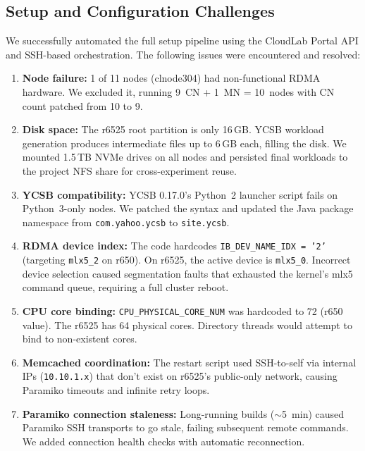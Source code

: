 \documentclass[11pt,a4paper]{article}
\begin{document}
\subsection{Setup and Configuration Challenges}

We successfully automated the full setup pipeline using the CloudLab Portal API and SSH-based orchestration. The following issues were encountered and resolved:

\begin{enumerate}[nosep]
    \item \textbf{Node failure:} 1 of 11 nodes (clnode304) had non-functional RDMA hardware. We excluded it, running 9~CN + 1~MN = 10~nodes with CN count patched from 10 to 9.

    \item \textbf{Disk space:} The r6525 root partition is only 16\,GB. YCSB workload generation produces intermediate files up to 6\,GB each, filling the disk. We mounted 1.5\,TB NVMe drives on all nodes and persisted final workloads to the project NFS share for cross-experiment reuse.

    \item \textbf{YCSB compatibility:} YCSB 0.17.0's Python~2 launcher script fails on Python~3-only nodes. We patched the syntax and updated the Java package namespace from \texttt{com.yahoo.ycsb} to \texttt{site.ycsb}.

    \item \textbf{RDMA device index:} The code hardcodes \texttt{IB\_DEV\_NAME\_IDX~=~'2'} (targeting \texttt{mlx5\_2} on r650). On r6525, the active device is \texttt{mlx5\_0}. Incorrect device selection caused segmentation faults that exhausted the kernel's mlx5 command queue, requiring a full cluster reboot.

    \item \textbf{CPU core binding:} \texttt{CPU\_PHYSICAL\_CORE\_NUM} was hardcoded to 72 (r650 value). The r6525 has 64 physical cores. Directory threads would attempt to bind to non-existent cores.

    \item \textbf{Memcached coordination:} The restart script used SSH-to-self via internal IPs (\texttt{10.10.1.x}) that don't exist on r6525's public-only network, causing Paramiko timeouts and infinite retry loops.

    \item \textbf{Paramiko connection staleness:} Long-running builds ($\sim$5~min) caused Paramiko SSH transports to go stale, failing subsequent remote commands. We added connection health checks with automatic reconnection.
\end{enumerate}
\end{document}
